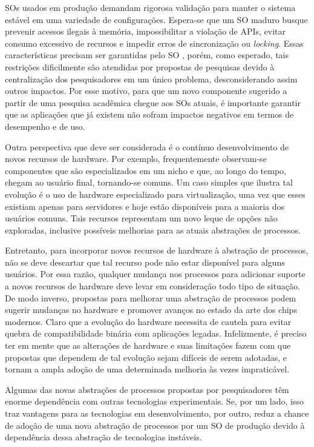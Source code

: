 SOs usados em produção demandam rigorosa validação para manter o sistema
estável em uma variedade de configurações. Espera-se que um SO maduro busque
prevenir acessos ilegais à memória, impossibilitar a violação de APIs, evitar
consumo excessivo de recursos e impedir erros de sincronização ou
\textit{locking}. Essas características precisam ser garantidas pelo SO
\citep{mondrix}, porém, como esperado, tais restrições dificilmente são
atendidas por propostas de pesquisas devido à centralização dos pesquisadores
em um único problema, desconsiderando assim outros impactos. Por esse motivo,
para que um novo componente sugerido a partir de uma pesquisa acadêmica chegue
aos SOs atuais, é importante garantir que as aplicações que já existem não
sofram impactos negativos em termos de desempenho e de uso.

Outra perspectiva que deve ser considerada é o contínuo desenvolvimento de novos
recursos de hardware. Por exemplo, frequentemente observam-se componentes que
são especializados em um nicho e que, ao longo do tempo, chegam ao usuário
final, tornando-se comuns. Um caso simples que ilustra tal evolução é o
uso de hardware especializado para virtualização, uma vez que esses existiam
apenas para servidores e hoje estão disponíveis para a maioria dos usuários
comuns. Tais recursos representam um novo leque de opções não exploradas,
inclusive possíveis melhorias para as atuais abstrações de processos.

Entretanto, para incorporar novos recursos de hardware à abstração de processos,
não se deve descartar que tal recurso pode não estar disponível para alguns
usuários. Por essa razão, qualquer mudança nos processos para adicionar suporte
a novos recursos de hardware deve levar em consideração todo tipo de situação.
De modo inverso, propostas para melhorar uma abstração de processos podem
sugerir mudanças no hardware e promover avanços no estado da arte dos chips
modernos. Claro que a evolução do hardware necessita de cautela para evitar
quebra de compatibilidade binária com aplicações legadas. Infelizmente, é
preciso ter em mente que as alterações de hardware e suas limitações fazem com
que propostas que dependem de tal evolução sejam difíceis de serem adotadas, e
tornam a ampla adoção de uma determinada melhoria às vezes impraticável.

Algumas das novas abstrações de processos propostas por pesquisadores têm
enorme dependência com outras tecnologias experimentais. Se, por um lado, isso
traz vantagens para as tecnologias em desenvolvimento, por outro, reduz a chance
de adoção de uma nova abstração de processos por um SO de produção devido à
dependência dessa abstração de tecnologias instáveis.

